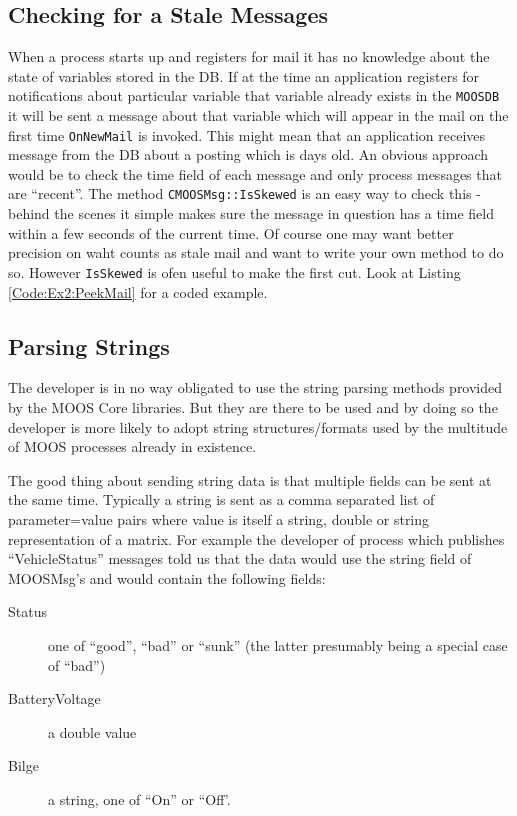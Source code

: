\documentclass[a4paper,10pt]{article}
\newcommand{\Code}[1]{\texttt{#1} }
\newcommand{\code}[1]{\Code{#1} }
\begin{document}
\subsection{Checking for a Stale Messages}
When a process starts up and registers for mail it has no knowledge about the state of variables stored in the DB. If at the time an application registers for notifications about  particular variable that variable already exists in the \code{MOOSDB} it will be sent a message about that variable which will appear in the mail on the first time \code{OnNewMail} is invoked. This might mean that an application receives message from the DB about a posting which is days old. An obvious approach  would be to check the time field of each message and only process messages that are ``recent''. The method \code{CMOOSMsg::IsSkewed} is an easy way to check this - behind the scenes it simple makes sure the message in question has a time field within a few seconds of the current time. Of course one may want better precision on waht counts as stale mail and want to write your own method to do so. However \code{IsSkewed} is ofen useful to make the first cut. Look at Listing \ref{Code:Ex2:PeekMail} for a coded example.





\subsection{Parsing Strings} \label{Sec:StringParsing}

The developer is in no way obligated to use the string parsing
methods provided by the MOOS Core libraries. But they are there to
be used and by doing so the developer is more likely to adopt
string structures/formats used by the multitude of MOOS processes
already in existence.

The good thing about sending string data is that multiple fields
can be sent at the same time. Typically a string  is sent as a
comma separated list of parameter=value pairs where value is
itself a string, double or string representation of a matrix. For
example the developer of process which publishes ``VehicleStatus''
messages told us that the data would use the string field of
MOOSMsg's and would contain the following fields:
\begin{description}
\item [Status] one of ``good'', ``bad'' or ``sunk'' (the latter
presumably being a special case of ``bad'')
\item [BatteryVoltage]  a double value
\item [Bilge] a string, one of ``On'' or ``Off'.
\end{description}
\end{document}
